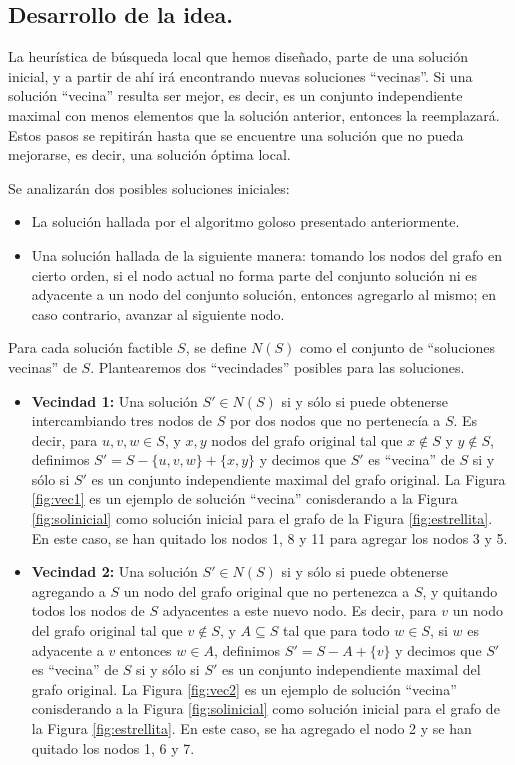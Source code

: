 \subsection{Desarrollo de la idea.}

\vspace*{0.3cm}

La heurística de búsqueda local que hemos diseñado, parte de una solución inicial, y a partir de ahí irá encontrando nuevas soluciones ``vecinas''.  Si una solución ``vecina'' resulta ser mejor, es decir, es un conjunto independiente maximal con menos elementos que la solución anterior, entonces la reemplazará.  Estos pasos se repitirán hasta que se encuentre una solución que no pueda mejorarse, es decir, una solución óptima local.

Se analizarán dos posibles soluciones iniciales:

\begin{itemize}
\item La solución hallada por el algoritmo goloso presentado anteriormente.
\item Una solución hallada de la siguiente manera: tomando los nodos del grafo en cierto orden, si el nodo actual no forma parte del conjunto solución ni es adyacente a un nodo del conjunto solución, entonces agregarlo al mismo; en caso contrario, avanzar al siguiente nodo.
\end{itemize}

Para cada solución factible $S$, se define $N(S)$ como el conjunto de ``soluciones vecinas'' de $S$.  Plantearemos dos ``vecindades'' posibles para las soluciones.  

\begin{itemize}
\item {\bf Vecindad 1:} Una solución $S' \in N(S)$ si y sólo si puede obtenerse intercambiando tres nodos de $S$ por dos nodos que no pertenecía a $S$.  Es decir, para $u,v,w \in S$, y $x,y$ nodos del grafo original tal que $x \not \in S$ y $y \not \in S$, definimos $S' = S - \{u,v,w\} + \{x,y\}$ y decimos que $S'$ es ``vecina'' de $S$ si y sólo si $S'$ es un conjunto independiente maximal del grafo original. La Figura \ref{fig:vec1} es un ejemplo de solución ``vecina'' conisderando a la Figura \ref{fig:solinicial} como solución inicial para el grafo de la Figura \ref{fig:estrellita}.  En este caso, se han quitado los nodos 1, 8 y 11 para agregar los nodos 3 y 5.
\item {\bf Vecindad 2:} Una solución $S' \in N(S)$ si y sólo si puede obtenerse agregando a $S$ un nodo del grafo original que no pertenezca a $S$, y quitando todos los nodos de $S$ adyacentes a este nuevo nodo.  Es decir, para $v$ un nodo del grafo original tal que $v \not \in S$, y $A \subseteq S$ tal que para todo $w \in S$, si $w$ es adyacente a $v$ entonces $w \in A$, definimos $S' = S - A + \{v\}$ y decimos que $S'$ es ``vecina'' de $S$ si y sólo si $S'$ es un conjunto independiente maximal del grafo original.  La Figura \ref{fig:vec2} es un ejemplo de solución ``vecina'' conisderando a la Figura \ref{fig:solinicial} como solución inicial para el grafo de la Figura \ref{fig:estrellita}.  En este caso, se ha agregado el nodo 2 y se han quitado los nodos 1, 6 y 7.
\end{itemize}

